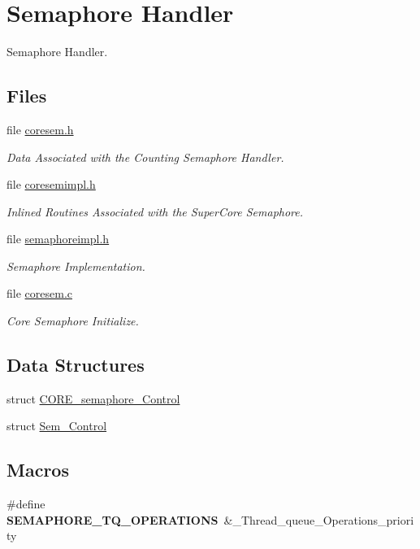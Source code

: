 \hypertarget{group__RTEMSScoreSemaphore}{}\section{Semaphore Handler}
\label{group__RTEMSScoreSemaphore}


Semaphore Handler.  


\subsection*{Files}
\begin{DoxyCompactItemize}
\item 
file \mbox{\hyperlink{coresem_8h}{coresem.\+h}}
\begin{DoxyCompactList}\small\item\em Data Associated with the Counting Semaphore Handler. \end{DoxyCompactList}\item 
file \mbox{\hyperlink{coresemimpl_8h}{coresemimpl.\+h}}
\begin{DoxyCompactList}\small\item\em Inlined Routines Associated with the Super\+Core Semaphore. \end{DoxyCompactList}\item 
file \mbox{\hyperlink{score_2semaphoreimpl_8h}{semaphoreimpl.\+h}}
\begin{DoxyCompactList}\small\item\em Semaphore Implementation. \end{DoxyCompactList}\item 
file \mbox{\hyperlink{coresem_8c}{coresem.\+c}}
\begin{DoxyCompactList}\small\item\em Core Semaphore Initialize. \end{DoxyCompactList}\end{DoxyCompactItemize}
\subsection*{Data Structures}
\begin{DoxyCompactItemize}
\item 
struct \mbox{\hyperlink{structCORE__semaphore__Control}{C\+O\+R\+E\+\_\+semaphore\+\_\+\+Control}}
\item 
struct \mbox{\hyperlink{structSem__Control}{Sem\+\_\+\+Control}}
\end{DoxyCompactItemize}
\subsection*{Macros}
\begin{DoxyCompactItemize}
\item 
\mbox{\label{group__RTEMSScoreSemaphore_gaf2b42dac784f8406cb2f6962eba08f96}} 
\#define {\bfseries S\+E\+M\+A\+P\+H\+O\+R\+E\+\_\+\+T\+Q\+\_\+\+O\+P\+E\+R\+A\+T\+I\+O\+NS}~\&\+\_\+\+Thread\+\_\+queue\+\_\+\+Operations\+\_\+priority
\end{DoxyCompactItemize}

